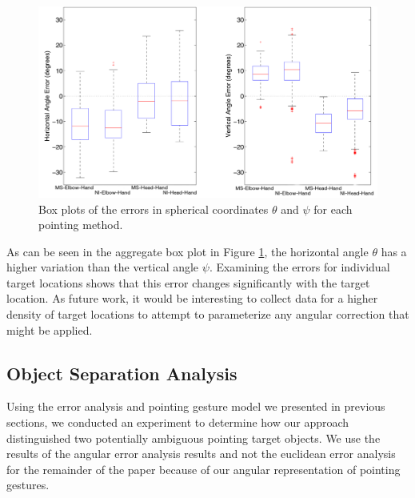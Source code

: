 \begin{figure}[ht!]%
\centering
\includegraphics[width=1.0\textwidth]{pics/boxplots_largerfont}
\caption{Box plots of the errors in spherical coordinates $\theta$ and $\psi$ for each pointing method.}
\label{fig:pointing_angular_boxplots}
\end{figure}

As can be seen in the aggregate box plot in Figure \ref{fig:pointing_angular_boxplots}, the horizontal angle $\theta$ has a higher variation than the vertical angle $\psi$.  Examining the errors for individual target locations shows that this error changes significantly with the target location.  As future work, it would be interesting to collect data for a higher density of target locations to attempt to parameterize any angular correction that might be applied.



\subsection{Object Separation Analysis}


Using the error analysis and pointing gesture model we presented in previous sections, we conducted an experiment to  determine how our approach distinguished two potentially ambiguous pointing target objects. We use the results of the angular error analysis results and not the euclidean error analysis for the remainder of the paper because of our angular representation of pointing gestures.

